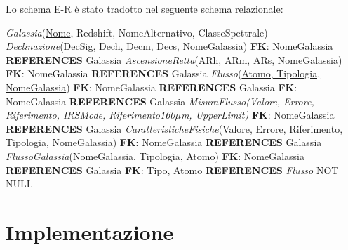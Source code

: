 \documentclass[12pt,a4paper,onecolumn,x11names]{article}
\begin{document}
	\begin{flushleft}
		Lo schema E-R è stato tradotto nel seguente schema relazionale:
		
		\textsf{\textit{Galassia}(\underline{Nome}, Redshift, NomeAlternativo, ClasseSpettrale)}\newline
		\textsf{\textit{Declinazione}(DecSig, Dech, Decm, Decs, NomeGalassia)}\newline
		\textsf{\textbf{FK}: NomeGalassia \textbf{REFERENCES} Galassia}\newline
		\textsf{\textit{AscensioneRetta}(ARh, ARm, ARs, NomeGalassia)}\newline
		\textsf{\textbf{FK}: NomeGalassia \textbf{REFERENCES} Galassia}\newline
		\textsf{\textit{Flusso}(\underline{Atomo, Tipologia, NomeGalassia})}\newline
		\textsf{\textbf{FK}: NomeGalassia \textbf{REFERENCES} Galassia}\newline
		\textsf{\textbf{FK}: NomeGalassia \textbf{REFERENCES} Galassia}\newline
		\textsf{\textit{MisuraFlusso(Valore, Errore, Riferimento, IRSMode, Riferimento160$\mu$m, UpperLimit)}}\newline
		\textsf{\textbf{FK}: NomeGalassia \textbf{REFERENCES} Galassia}\newline
		\textsf{\textit{CaratteristicheFisiche}(Valore, Errore, Riferimento, \underline{Tipologia, NomeGalassia})}\newline
		\textsf{\textbf{FK}: NomeGalassia \textbf{REFERENCES} Galassia}\newline\newline		
		\textsf{\textit{FlussoGalassia}(NomeGalassia, Tipologia, Atomo)}\newline
		\textsf{\textbf{FK}: NomeGalassia \textbf{REFERENCES} Galassia}\newline
		\textsf{\textbf{FK}: Tipo, Atomo \textbf{REFERENCES} \textit{Flusso} NOT NULL}
	\end{flushleft}


\section{Implementazione}
\end{document}
